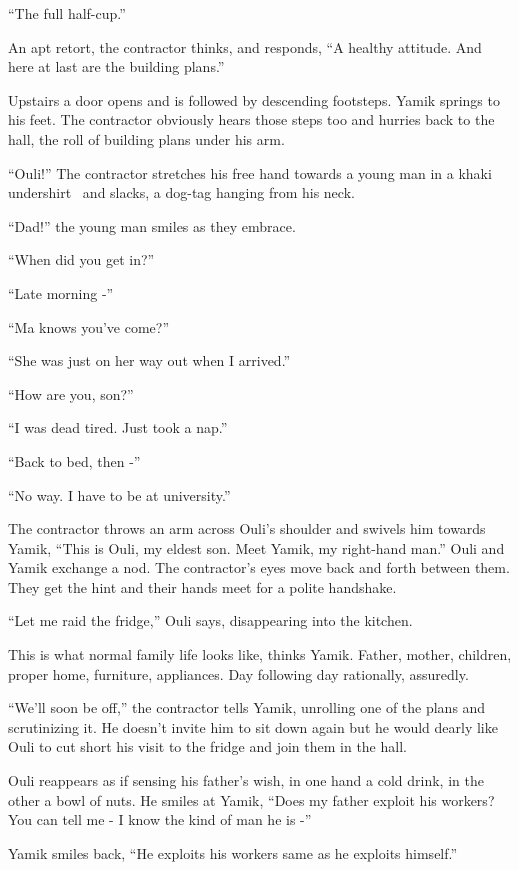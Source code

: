\documentclass[twoside,11pt]{book}
\begin{document}
``The full half-cup.''

An apt retort, the contractor thinks, and responds, ``A healthy attitude. And here at last are the
building plans.''

Upstairs a door opens and is followed by descending footsteps. Yamik springs to his feet. The contractor obviously hears
those steps too and hurries back to the hall, the roll of building plans under his arm.

``Ouli!'' The contractor stretches his free hand towards a young man in a khaki undershirt
\ and slacks, a dog-tag hanging from his neck.

``Dad!'' the young man smiles as they embrace.

``When did you get in?''

``Late morning -''

``Ma knows you've come?''

``She was just on her way out when I arrived.''

``How are you, son?''

``I was dead tired. Just took a nap.''

``Back to bed, then -''

``No way. I have to be at university.''

The contractor throws an arm across Ouli's shoulder and swivels him towards Yamik, ``This is Ouli, my
eldest son. Meet Yamik, my right-hand man.'' Ouli and Yamik exchange a nod. The contractor's eyes move
back and forth between them. They get the hint and their hands meet for a polite handshake.

``Let me raid the fridge,'' Ouli says, disappearing into the kitchen.

This is what normal family life looks like, thinks Yamik. Father, mother, children, proper home, furniture, appliances.
Day following day rationally, assuredly.

``We'll soon be off,'' the contractor tells Yamik, unrolling one of the plans and scrutinizing
it. He doesn't invite him to sit down again but he would dearly like Ouli to cut short his visit to the fridge and join
them in the hall.

Ouli reappears as if sensing his father's wish, in one hand a cold drink, in the other a bowl of nuts. He smiles at
Yamik, ``Does my father exploit his workers? You can tell me - I know the kind of man he is
-''

Yamik smiles back, ``He exploits his workers same as he exploits himself.''
\end{document}
